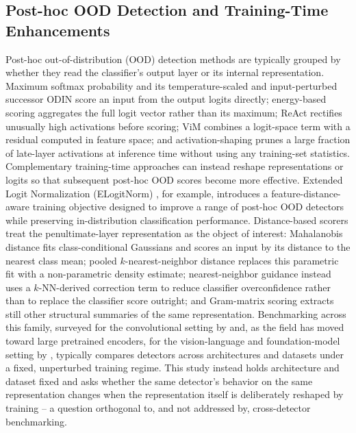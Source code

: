 \subsection{Post-hoc OOD Detection and Training-Time Enhancements}
\label{sec:rw-ood}

Post-hoc out-of-distribution (OOD) detection methods are typically grouped by whether they read the classifier's output layer or its internal representation. Maximum softmax probability \citep{hendrycks2017baseline} and its temperature-scaled and input-perturbed successor ODIN \citep{liang2018enhancing} score an input from the output logits directly; energy-based scoring \citep{liu2020energy} aggregates the full logit vector rather than its maximum; ReAct \citep{sun2021react} rectifies unusually high activations before scoring; ViM \citep{wang2022vim} combines a logit-space term with a residual computed in feature space; and activation-shaping \citep{djurisic2023ash} prunes a large fraction of late-layer activations at inference time without using any training-set statistics. Complementary training-time approaches can instead reshape representations or logits so that subsequent post-hoc OOD scores become more effective. Extended Logit Normalization (ELogitNorm) \citep{ding2025enhancing}, for example, introduces a feature-distance-aware training objective designed to improve a range of post-hoc OOD detectors while preserving in-distribution classification performance. Distance-based scorers treat the penultimate-layer representation as the object of interest: Mahalanobis distance \citep{lee2018simple} fits class-conditional Gaussians and scores an input by its distance to the nearest class mean; pooled $k$-nearest-neighbor distance \citep{sun2022knn} replaces this parametric fit with a non-parametric density estimate; nearest-neighbor guidance \citep{park2023nnguide} instead uses a $k$-NN-derived correction term to reduce classifier overconfidence rather than to replace the classifier score outright; and Gram-matrix scoring \citep{sastry2020gram} extracts still other structural summaries of the same representation. Benchmarking across this family, surveyed for the convolutional setting by \citet{yang2024oodsurvey} and, as the field has moved toward large pretrained encoders, for the vision-language and foundation-model setting by \citet{miyai2024generalized}, typically compares detectors across architectures and datasets under a fixed, unperturbed training regime. This study instead holds architecture and dataset fixed and asks whether the same detector's behavior on the same representation changes when the representation itself is deliberately reshaped by training -- a question orthogonal to, and not addressed by, cross-detector benchmarking.

